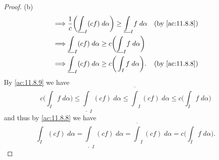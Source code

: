 \begin{proof}{(b)}
\begin{align*}
    \implies & \dfrac{1}{c} \bigg(\underline{\int}_I (cf) \; d \alpha\bigg) \geq \underline{\int}_I f \; d \alpha &  & \text{(by \cref{ac:11.8.8})}            \\
    \implies & \underline{\int}_I (cf) \; d \alpha \geq c\bigg(\underline{\int}_I f \; d \alpha\bigg)                                                          \\
    \implies & \underline{\int}_I (cf) \; d \alpha \geq c\bigg(\int_I f \; d \alpha\bigg).                        &  & \text{(by \cref{ac:11.8.8})}
  \end{align*}
  By \cref{ac:11.8.9} we have
  \[
    c\bigg(\int_I f \; d \alpha\bigg) \leq \underline{\int}_I (cf) \; d \alpha \leq \overline{\int}_I (cf) \; d \alpha \leq c\bigg(\int_I f \; d \alpha\bigg)
  \]
  and thus by \cref{ac:11.8.8} we have
  \[
    \int_I (cf) \; d \alpha = \underline{\int}_I (cf) \; d \alpha = \overline{\int}_I (cf) \; d \alpha = c\bigg(\int_I f \; d \alpha\bigg).
  \]


\end{proof}
